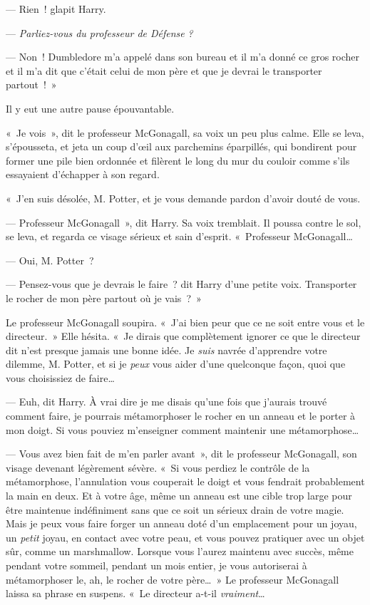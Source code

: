 --- Rien~! glapit Harry.

--- \emph{Parliez-vous du professeur de Défense} \emph{?}

--- Non~! Dumbledore m'a appelé dans son bureau et il m'a donné ce gros rocher et il m'a dit que c'était celui de mon père et que je devrai le transporter partout~!~»

Il y eut une autre pause épouvantable.

«~Je vois~», dit le professeur McGonagall, sa voix un peu plus calme. Elle se leva, s'épousseta, et jeta un coup d'œil aux parchemins éparpillés, qui bondirent pour former une pile bien ordonnée et filèrent le long du mur du couloir comme s'ils essayaient d'échapper à son regard.

«~J'en suis désolée, M. Potter, et je vous demande pardon d'avoir douté de vous.

--- Professeur McGonagall~», dit Harry. Sa voix tremblait. Il poussa contre le sol, se leva, et regarda ce visage sérieux et sain d'esprit. «~Professeur McGonagall…

--- Oui, M. Potter~?

--- Pensez-vous que je devrais le faire~? dit Harry d'une petite voix. Transporter le rocher de mon père partout où je vais~?~»

Le professeur McGonagall soupira. «~J'ai bien peur que ce ne soit entre vous et le directeur.~» Elle hésita. «~Je dirais que complètement ignorer ce que le directeur dit n'est presque jamais une bonne idée. Je \emph{suis} navrée d'apprendre votre dilemme, M. Potter, et si je \emph{peux} vous aider d'une quelconque façon, quoi que vous choisissiez de faire…

--- Euh, dit Harry. À vrai dire je me disais qu'une fois que j'aurais trouvé comment faire, je pourrais métamorphoser le rocher en un anneau et le porter à mon doigt. Si vous pouviez m'enseigner comment maintenir une métamorphose…

--- Vous avez bien fait de m'en parler avant~», dit le professeur McGonagall, son visage devenant légèrement sévère. «~Si vous perdiez le contrôle de la métamorphose, l'annulation vous couperait le doigt et vous fendrait probablement la main en deux. Et à votre âge, même un anneau est une cible trop large pour être maintenue indéfiniment sans que ce soit un sérieux drain de votre magie. Mais je peux vous faire forger un anneau doté d'un emplacement pour un joyau, un \emph{petit} joyau, en contact avec votre peau, et vous pouvez pratiquer avec un objet sûr, comme un marshmallow. Lorsque vous l'aurez maintenu avec succès, même pendant votre sommeil, pendant un mois entier, je vous autoriserai à métamorphoser le, ah, le rocher de votre père…~» Le professeur McGonagall laissa sa phrase en suspens. «~Le directeur a-t-il \emph{vraiment}…

